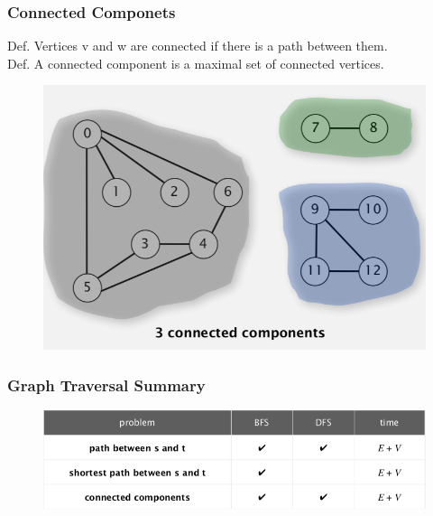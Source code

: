 \documentclass[11pt]{beamer}
\begin{document}
\begin{frame}
	\frametitle	{Connected Componets} 
    \alert{Def.} Vertices v and w are \alert{connected} if there is a path between them.  \\
    \alert{Def.} A \alert{connected component} is a maximal set of connected vertices.
    \begin{figure}
    	\centering
    	\includegraphics[width=0.7\linewidth]{"Screenshot 2020-12-01 at 12.15.00 PM"}
    	\label{fig:screenshot-2020-12-01-at-12}
    \end{figure}
\end{frame}

\begin{frame}
	\frametitle	{Graph Traversal Summary} 
	\begin{figure}
		\centering
		\includegraphics[width=1\linewidth]{"Screenshot 2020-12-01 at 12.20.47 PM"}
		\label{fig:screenshot-2020-12-01-at-12}
	\end{figure}	
\end{frame}
\end{document}
